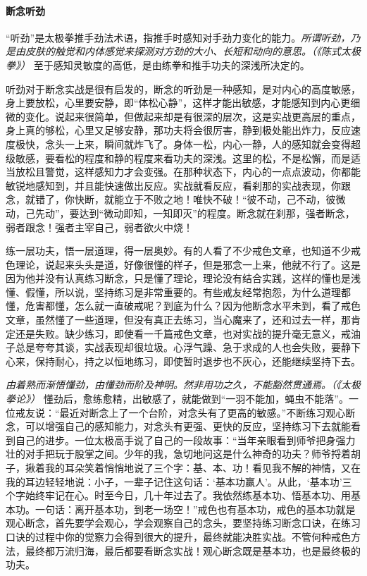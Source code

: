 \paragraph{断念听劲}

“听劲”是太极拳推手劲法术语，指推手时感知对手劲力变化的能力。\textit{所谓听劲，乃是由皮肤的触觉和内体感觉来探测对方劲的大小、长短和动向的意思。（《陈式太极拳》）} 至于感知灵敏度的高低，是由练拳和推手功夫的深浅所决定的。

听劲对于断念实战是很有启发的，断念的听劲是一种感知，是对内心的高度敏感，身上要放松，心里要安静，即“体松心静”，这样才能出敏感，才能感知到内心更细微的变化。说起来很简单，但做起来却是有很深的层次，这是实战更高层的重点，身上真的够松，心里又足够安静，那功夫将会很厉害，静到极处能出炸力，反应速度极快，念头一上来，瞬间就炸飞了。身体一松，内心一静，人的感知就会变得超级敏感，要看松的程度和静的程度来看功夫的深浅。这里的松，不是松懈，而是适当放松且警觉，这样感知力才会变强。在那种状态下，内心的一点点波动，你都能敏锐地感知到，并且能快速做出反应。实战就看反应，看刹那的实战表现，你跟念，就错了，你快断，就能立于不败之地！唯快不破！“彼不动，己不动，彼微动，己先动”，要达到“微动即知，一知即灭”的程度。断念就在刹那，强者断念，弱者跟念！强者主宰自己，弱者欲火中烧！

练一层功夫，悟一层道理，得一层奥妙。有的人看了不少戒色文章，也知道不少戒色理论，说起来头头是道，好像很懂的样子，但是邪念一上来，他就不行了。这是因为他并没有认真练习断念，只是懂了理论，理论没有结合实践，这样的懂也是浅懂、假懂，所以说，坚持练习是非常重要的。有些戒友经常抱怨，为什么道理都懂，危害都懂，怎么就一直破戒呢？到底为什么？因为他断念水平未到，看了戒色文章，虽然懂了一些道理，但没有真正去练习，当心魔来了，还和过去一样，那肯定还是失败。缺少练习，即使看一千篇戒色文章，也对实战的提升毫无意义，戒油子总是夸夸其谈，实战表现却很垃圾。心浮气躁、急于求成的人也会失败，要静下心来，保持耐心，持之以恒地练习，即使暂时退步也不灰心，还能继续坚持下去。

\textit{由着熟而渐悟懂劲，由懂劲而阶及神明。然非用功之久，不能豁然贯通焉。（《太极拳论》）} 懂劲后，愈练愈精，出敏感了，就能做到“一羽不能加，蝇虫不能落”。一位戒友说：“最近对断念上了一个台阶，对念头有了更高的敏感。”不断练习观心断念，可以增强自己的感知能力，对念头有更强、更快的反应，坚持练习下去就能看到自己的进步。一位太极高手说了自己的一段故事：“当年亲眼看到师爷把身强力壮的对手把玩于股掌之间。少年的我，急切地问这是什么神奇的功夫？师爷捋着胡子，揪着我的耳朵笑着悄悄地说了三个字：基、本、功！看见我不解的神情，又在我的耳边轻轻地说：小子，一辈子记住这句话：‘基本功赢人’。从此，‘基本功’三个字始终牢记在心。时至今日，几十年过去了。我依然练基本功、悟基本功、用基本功。一句话：离开基本功，到老一场空！”戒色也有基本功，戒色的基本功就是观心断念，首先要学会观心，学会观察自己的念头，要坚持练习断念口诀，在练习口诀的过程中你的觉察力会得到很大的提升，最终就能决胜实战。不管何种戒色方法，最终都万流归海，最后都要看断念实战！观心断念既是基本功，也是最终极的功夫。


